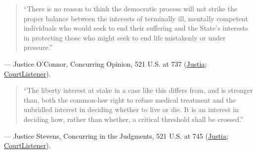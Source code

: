 \documentclass[12pt]{article}
\begin{document}
\begin{quote}
``There is no reason to think the democratic process will not strike the proper balance between the interests of terminally ill, mentally competent individuals who would seek to end their suffering and the State's interests in protecting those who might seek to end life mistakenly or under pressure.''
\end{quote}
\noindent --- Justice O'Connor, Concurring Opinion, 521 U.S. at 737 (\href{https://supreme.justia.com/cases/federal/us/521/702/}{Justia}; \href{https://www.courtlistener.com/opinion/118144/washington-v-glucksberg/}{CourtListener}).

\begin{quote}
``The liberty interest at stake in a case like this differs from, and is stronger than, both the common-law right to refuse medical treatment and the unbridled interest in deciding whether to live or die. It is an interest in deciding how, rather than whether, a critical threshold shall be crossed.''
\end{quote}
\noindent --- Justice Stevens, Concurring in the Judgments, 521 U.S. at 745 (\href{https://supreme.justia.com/cases/federal/us/521/702/}{Justia}; \href{https://www.courtlistener.com/opinion/118144/washington-v-glucksberg/}{CourtListener}).
\end{document}
